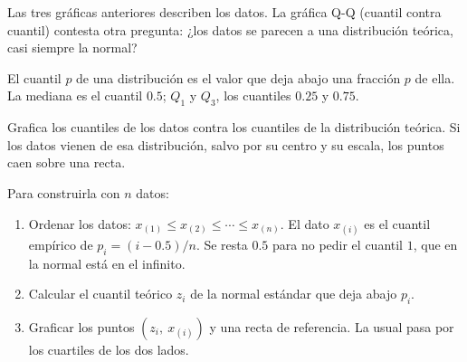 \documentclass[11pt,letterpaper]{article}
\begin{document}
Las tres gráficas anteriores describen los datos. La gráfica Q-Q
(cuantil contra cuantil) contesta otra pregunta: ¿los datos se
parecen a una distribución teórica, casi siempre la normal?

\begin{definicion}[Cuantil]
    El cuantil $p$ de una distribución es el valor que deja abajo una
    fracción $p$ de ella. La mediana es el cuantil $0.5$; $Q_1$ y
    $Q_3$, los cuantiles $0.25$ y $0.75$.
\end{definicion}

\begin{definicion}[Gráfica Q-Q]
    Grafica los cuantiles de los datos contra los cuantiles de la
    distribución teórica. Si los datos vienen de esa distribución,
    salvo por su centro y su escala, los puntos caen sobre una recta.
\end{definicion}

Para construirla con $n$ datos:

\begin{enumerate}[itemsep=0.3em]
    \item Ordenar los datos: $x_{(1)} \le x_{(2)} \le \cdots \le
          x_{(n)}$. El dato $x_{(i)}$ es el cuantil empírico de
          $p_i = (i - 0.5)/n$. Se resta $0.5$ para no pedir el cuantil
          $1$, que en la normal está en el infinito.
    \item Calcular el cuantil teórico $z_i$ de la normal estándar que
          deja abajo $p_i$.
    \item Graficar los puntos $(z_i,\ x_{(i)})$ y una recta de
          referencia. La usual pasa por los cuartiles de los dos
          lados.
\end{enumerate}
\end{document}
